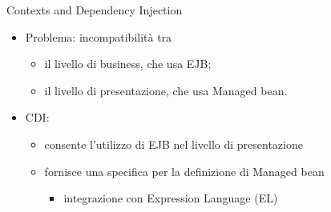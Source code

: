 \begin{frame}{Contexts and Dependency Injection}

\begin{itemize}
\item Problema: incompatibilità tra
	\begin{itemize}
	
	\vspace{0.5em}
	
	\item il livello di business, che usa EJB;
	
	\vspace{0.8em}
	
	\item il livello di presentazione, che usa Managed bean.
	\end{itemize}
	
\vspace{1em}	

\item CDI:
	\begin{itemize}
	
	\vspace{0.5em}
	
	\item consente l'utilizzo di EJB nel livello di presentazione
	
	\vspace{0.8em}
	
	\item fornisce una specifica per la definizione di Managed bean
		\begin{itemize}
		
		\vspace{0.5em}
		
		\item integrazione con Expression Language (EL)
		\end{itemize}
	\end{itemize}
\end{itemize}

\end{frame}



